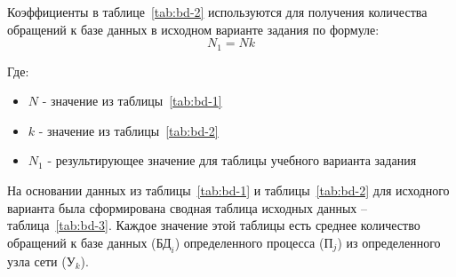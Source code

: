 \documentclass[russian,utf8,emptystyle]{eskdtext}
\begin{document}
Коэффициенты в таблице~\ref{tab:bd-2} используются для получения количества обращений к базе данных в исходном варианте задания по формуле:
$$
    N_1 = N k
$$

Где:
\begin{itemize}[label=-]
\item $N$ - значение из таблицы~\ref{tab:bd-1}
\item $k$ - значение из таблицы~\ref{tab:bd-2}
\item $N_1$ - результирующее значение для таблицы учебного варианта задания
\end{itemize}

На основании данных из таблицы~\ref{tab:bd-1} и таблицы~\ref{tab:bd-2} для исходного варианта была сформирована сводная таблица исходных данных – таблица~\ref{tab:bd-3}. Каждое значение этой таблицы есть среднее количество обращений к базе данных ($\text{БД}_i$) определенного процесса ($\text{П}_j$) из определенного узла сети ($\text{У}_k$).
\end{document}
